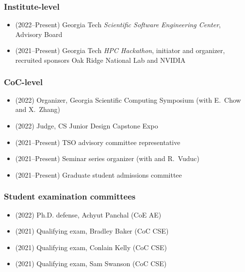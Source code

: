 \subsubsection{Institute-level}
\begin{itemize}
    \item (2022--Present) Georgia Tech \textit{Scientific Software Engineering Center}, Advisory Board
    \item (2021--Present) Georgia Tech \textit{HPC Hackathon}, initiator and organizer, recruited sponsors Oak Ridge National Lab and NVIDIA 
\end{itemize}

\subsubsection{CoC-level}
\begin{itemize}
    \item (2022) Organizer, Georgia Scientific Computing Symposium (with E.\ Chow and X.\ Zhang)
    \item (2022) Judge, CS Junior Design Capstone Expo
    \item (2021--Present) TSO advisory committee representative
    \item (2021--Present) Seminar series organizer (with \Florian and R.\ Vuduc)
    \item (2021--Present) Graduate student admissions committee
\end{itemize}

\subsubsection{Student examination committees}
\begin{itemize}
    \item (2022) Ph.D. defense, Achyut Panchal (CoE AE)
    \item (2021) Qualifying exam, Bradley Baker (CoC CSE)
    \item (2021) Qualifying exam, Conlain Kelly (CoC CSE)
    \item (2021) Qualifying exam, Sam Swanson (CoC CSE)
\end{itemize}

